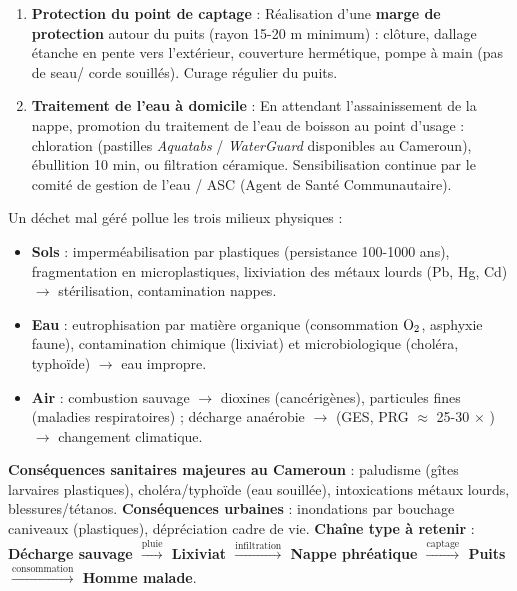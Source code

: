 \documentclass[11pt]{article}
\newcommand{\cle}[1]{{\popxbold\color{popdark}#1}}
\begin{document}
\begin{exoresolu}
\begin{enumerate}
\begin{enumerate}
\item \textbf{Protection du point de captage} : Réalisation d'une \textbf{marge de protection} autour du puits (rayon 15-20 m minimum) : clôture, dallage étanche en pente vers l'extérieur, couverture hermétique, pompe à main (pas de seau/ corde souillés). Curage régulier du puits.
\item \textbf{Traitement de l'eau à domicile} : En attendant l'assainissement de la nappe, promotion du traitement de l'eau de boisson au point d'usage : chloration (pastilles \emph{Aquatabs} / \emph{WaterGuard} disponibles au Cameroun), ébullition 10 min, ou filtration céramique. Sensibilisation continue par le comité de gestion de l'eau / ASC (Agent de Santé Communautaire).
\end{enumerate}
\end{enumerate}
\end{exoresolu}

\begin{aretenir}
Un déchet mal géré pollue les trois milieux physiques :
\begin{itemize}
\item \textbf{Sols} : imperméabilisation par plastiques (persistance 100-1000 ans), fragmentation en microplastiques, \cle{lixiviation} des métaux lourds (Pb, Hg, Cd) $\rightarrow$ stérilisation, contamination nappes.
\item \textbf{Eau} : eutrophisation par matière organique (consommation $\ce{O2}$, asphyxie faune), contamination chimique (lixiviat) et microbiologique (choléra, typhoïde) $\rightarrow$ eau impropre.
\item \textbf{Air} : combustion sauvage $\rightarrow$ dioxines (cancérigènes), particules fines (maladies respiratoires) ; décharge anaérobie $\rightarrow$  (GES, PRG $\approx$ 25-30 $\times$ ) $\rightarrow$ changement climatique.
\end{itemize}
\textbf{Conséquences sanitaires majeures au Cameroun} : paludisme (gîtes larvaires plastiques), choléra/typhoïde (eau souillée), intoxications métaux lourds, blessures/tétanos.
\textbf{Conséquences urbaines} : inondations par bouchage caniveaux (plastiques), dépréciation cadre de vie.
\textbf{Chaîne type à retenir} : \textbf{Décharge sauvage $\xrightarrow{\text{pluie}}$ Lixiviat $\xrightarrow{\text{infiltration}}$ Nappe phréatique $\xrightarrow{\text{captage}}$ Puits $\xrightarrow{\text{consommation}}$ Homme malade}.
\end{aretenir}
\end{document}
